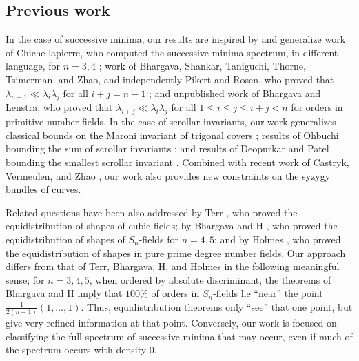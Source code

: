 \documentclass[letterpaper,10pt]{amsart}
\theoremstyle{definition}
\theoremstyle{remark}
\begin{document}
\subsection{Previous work}
In the case of successive minima, our results are inspired by and generalize work of Chiche-lapierre, who computed the successive minima spectrum, in different language, for $n = 3,4$ \cite{chiche}; work of Bhargava, Shankar, Taniguchi, Thorne, Tsimerman, and Zhao, and independently Pikert and Rosen, who proved that $\lambda_{n-1} \ll \lambda_i\lambda_j$ for all $i + j = n-1$ \cite{TwoTorsion, pikert}; and unpublished work of Bhargava and Lenstra, who proved that $\lambda_{i+j} \ll \lambda_i\lambda_j$ for all $1 \leq i \leq j \leq i+j < n$ for orders in primitive number fields. In the case of scrollar invariants, our work generalizes classical bounds on the Maroni invariant of trigonal covers \cite{maroni}; results of Ohbuchi bounding the sum of scrollar invariants \cite{obuchi}; and results of Deopurkar and Patel bounding the smallest scrollar invariant \cite{anands}. Combined with recent work of Castryk, Vermeulen, and Zhao \cite{wouter}, our work also provides new constraints on the syzygy bundles of curves.

Related questions have been also addressed by Terr \cite{Terr97}, who proved the equidistribution of shapes of cubic fields; by Bhargava and H \cite{BhaHa16}, who proved the equidistribution of shapes of $S_n$-fields for $n = 4,5$; and by Holmes \cite{holmes}, who proved the equidistribution of shapes in pure prime degree number fields. Our approach differs from that of Terr, Bhargava, H, and Holmes in the following meaningful sense; for $n = 3,4,5$, when ordered by absolute discriminant, the theorems of Bhargava and H imply that $100\%$ of orders in $S_n$-fields lie ``near'' the point $\frac{1}{2(n-1)}(1,\dots,1)$. Thus, equidistribution theorems only ``see'' that one point, but give very refined information at that point. Conversely, our work is focused on classifying the full spectrum of successive minima that may occur, even if much of the spectrum occurs with density $0$.
\end{document}
